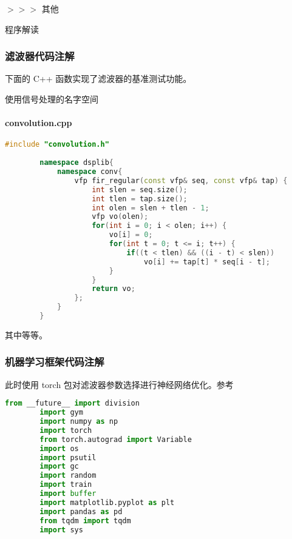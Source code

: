 $>>>$ 其他

程序解读

\subsubsection{滤波器代码注解}

下面的 C++ 函数实现了滤波器的基准测试功能。

使用信号处理的名字空间

\paragraph{convolution.cpp}

\begin{center}
    \begin{lstlisting}[language=C++]
        #include "convolution.h"
    
        namespace dsplib{
            namespace conv{
                vfp fir_regular(const vfp& seq, const vfp& tap) {
                    int slen = seq.size();
                    int tlen = tap.size();
                    int olen = slen + tlen - 1;
                    vfp vo(olen);
                    for(int i = 0; i < olen; i++) {
                        vo[i] = 0;
                        for(int t = 0; t <= i; t++) {
                            if((t < tlen) && ((i - t) < slen))
                                vo[i] += tap[t] * seq[i - t];
                        }
                    }
                    return vo;
                };
            }
        }
    \end{lstlisting}    
\end{center}
其中等等。

\subsubsection{机器学习框架代码注解}

此时使用 torch 包对滤波器参数选择进行神经网络优化。参考

\begin{center}
    \begin{lstlisting}[language=python]
        from __future__ import division
        import gym
        import numpy as np
        import torch
        from torch.autograd import Variable
        import os
        import psutil
        import gc
        import random
        import train
        import buffer
        import matplotlib.pyplot as plt
        import pandas as pd
        from tqdm import tqdm
        import sys
    \end{lstlisting}
\end{center}

